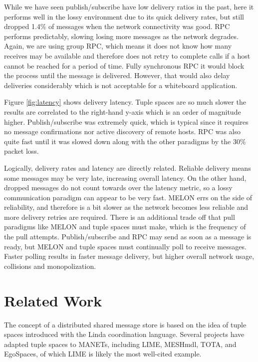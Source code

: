 \documentclass{llncs}
\begin{document}
While we have seen publish/subscribe have low delivery ratios in the past\cite{collins2010quantitative}, here it performs well in the lossy environment due to its quick delivery rates, but still dropped 1.4\% of messages when the network connectivity was good. RPC performs predictably, slowing losing more messages as the network degrades. Again, we are using group RPC, which means it does not know how many receives may be available and therefore does not retry to complete calls if a host cannot be reached for a period of time. Fully synchronous RPC it would block the process until the message is delivered. However, that would also delay deliveries considerably which is not acceptable for a whiteboard application.

Figure \ref{fig:latency} shows delivery latency. Tuple spaces are so much slower the results are correlated to the right-hand y-axis which is an order of magnitude higher. Publish/subscribe was extremely quick, which is typical since it requires no message confirmations nor active discovery of remote hosts. RPC was also quite fast until it was slowed down along with the other paradigms by the 30\% packet loss.

Logically, delivery rates and latency are directly related. Reliable delivery means some messages may be very late, increasing overall latency. On the other hand, dropped messages do not count towards over the latency metric, so a lossy communication paradigm can appear to be very fast. MELON errs on the side of reliability, and therefore is a bit slower as the network becomes less reliable and more delivery retries are required. There is an additional trade off that pull paradigms like MELON and tuple spaces must make, which is the frequency of the pull attempts. Publish/subscribe and RPC may send as soon as a message is ready, but MELON and tuple spaces must continually poll to receive messages. Faster polling results in faster message delivery, but higher overall network usage, collisions and monopolization.



\section{Related Work}\label{sec:relatedwork}

The concept of a distributed shared message store is based on the idea of tuple spaces introduced with the Linda\cite{linda} coordination language. Several projects have adapted tuple spaces to MANETs, including LIME\cite{lime}, MESHmdl\cite{meshmdl}, TOTA\cite{tota}, and EgoSpaces\cite{egospaces}, of which LIME is likely the most well-cited example.
\end{document}
